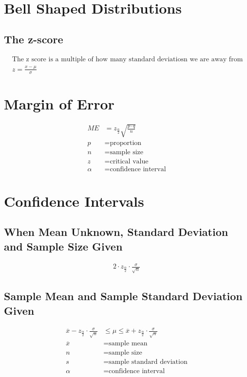 \documentclass{article}
\begin{document}
\section{Bell Shaped Distributions}

\subsection{The z-score}

\begin{align*}
    &\text{The z score is a multiple of how many standard deviatiosn we are away from the mean.}\\
    & z = \frac{x - \mu}{\sigma}
\end{align*}

\section{Margin of Error}

\begin{align*}
    ME &= z_{\frac{\alpha}{2}}\sqrt{\frac{p \cdot q}{n}}\\
    p &= \text{proportion} \\
    n &= \text{sample size} \\
    z &= \text{critical value}\\ 
    \alpha &= \text{confidence interval}     
\end{align*}

\section{Confidence Intervals}

\subsection{When Mean Unknown, Standard Deviation and Sample Size Given}

\begin{align*}
    2 \cdot z_{\frac{\alpha}{2}} \cdot \frac{\sigma}{\sqrt{n}}
\end{align*}

\subsection{Sample Mean and Sample Standard Deviation Given}

\begin{align*}
    \overline{x} -  z_{\frac{\alpha}{2}} \cdot \frac{\sigma}{\sqrt{n}} &\leq \mu \leq \overline{x} +  z_{\frac{\alpha}{2}} \cdot \frac{\sigma}{\sqrt{n}}\\
    \overline{x} &= \text{sample mean}\\
    n &= \text{sample size}\\
    s &= \text{sample standard deviation}\\
    \alpha &= \text{confidence interval}
\end{align*}
\end{document}
